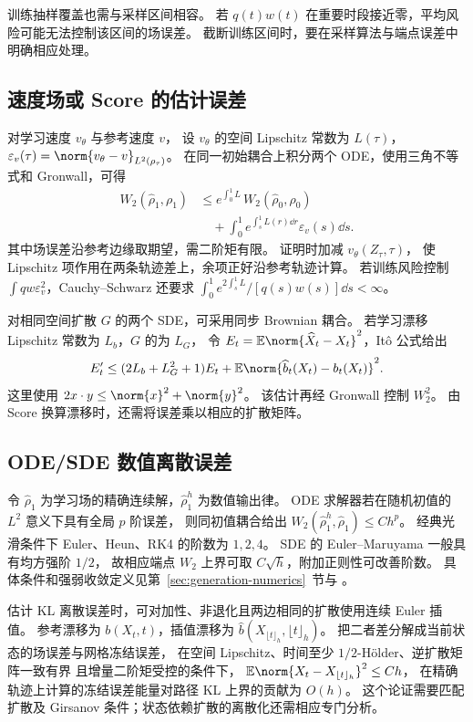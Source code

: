 训练抽样覆盖也需与采样区间相容。
若 \(q(t)w(t)\) 在重要时段接近零，平均风险可能无法控制该区间的场误差。
截断训练区间时，要在采样算法与端点误差中明确相应处理。

\subsection{速度场或 Score 的估计误差}

对学习速度 \(v_\theta\) 与参考速度 \(v\)，
设 \(v_\theta\) 的空间 Lipschitz 常数为 \(L(\tau)\)，
\(\varepsilon_v(\tau)=\norm{v_\theta-v}_{L^2(\rho_\tau)}\)。
在同一初始耦合上积分两个 ODE，使用三角不等式和 Gronwall，可得
\begin{equation}
 \begin{aligned}
 W_2(\widehat\rho_1,\rho_1)
 &\le e^{\int_0^1L}\,W_2(\widehat\rho_0,\rho_0)\\
 &\quad+\int_0^1 e^{\int_s^1L(r)\dd r}\varepsilon_v(s)\dd s.
 \end{aligned}
 \label{eq:unified-w2-bound}
\end{equation}
其中场误差沿参考边缘取期望，需二阶矩有限。
证明时加减 \(v_\theta(Z_\tau,\tau)\)，
使 Lipschitz 项作用在两条轨迹差上，余项正好沿参考轨迹计算。
若训练风险控制 \(\int qw\varepsilon_v^2\)，Cauchy--Schwarz 还要求
\(\int_0^1 e^{2\int_s^1L}/[q(s)w(s)]\dd s<\infty\)。

对相同空间扩散 \(G\) 的两个 SDE，可采用同步 Brownian 耦合。
若学习漂移 Lipschitz 常数为 \(L_b\)，\(G\) 的为 \(L_G\)，
令 \(E_t=\mathbb E\norm{\widehat X_t-X_t}^2\)，It\^o 公式给出
\[
 E_t'\le(2L_b+L_G^2+1)E_t+
                    \mathbb E\norm{\widehat b_t(X_t)-b_t(X_t)}^2.
\]
这里使用 \(2x\cdot y\le\norm{x}^2+\norm{y}^2\)。
该估计再经 Gronwall 控制 \(W_2^2\)。
由 Score 换算漂移时，还需将误差乘以相应的扩散矩阵。

\subsection{ODE/SDE 数值离散误差}

令 \(\widehat\rho_1\) 为学习场的精确连续解，\(\widehat\rho_1^h\) 为数值输出律。
ODE 求解器若在随机初值的 \(L^2\) 意义下具有全局 \(p\) 阶误差，
则同初值耦合给出
\(W_2(\widehat\rho_1^h,\widehat\rho_1)\le C h^p\)。
经典光滑条件下 Euler、Heun、RK4 的阶数为 \(1,2,4\)。
SDE 的 Euler--Maruyama 一般具有均方强阶 \(1/2\)，
故相应端点 \(W_2\) 上界可取 \(C\sqrt h\)，附加正则性可改善阶数。
具体条件和强弱收敛定义见第~\ref{sec:generation-numerics}~节与 \cite{higham2001sde}。

估计 KL 离散误差时，可对加性、非退化且两边相同的扩散使用连续 Euler 插值。
参考漂移为 \(b(X_t,t)\)，插值漂移为
\(\widehat b(X_{\lfloor t\rfloor_h},\lfloor t\rfloor_h)\)。
把二者差分解成当前状态的场误差与网格冻结误差，
在空间 Lipschitz、时间至少 \(1/2\)-Hölder、逆扩散矩阵一致有界
且增量二阶矩受控的条件下，
\(\mathbb E\norm{X_t-X_{\lfloor t\rfloor_h}}^2\le Ch\)，
在精确轨迹上计算的冻结误差能量对路径 KL 上界的贡献为 \(O(h)\)。
这个论证需要匹配扩散及 Girsanov 条件；状态依赖扩散的离散化还需相应专门分析。

